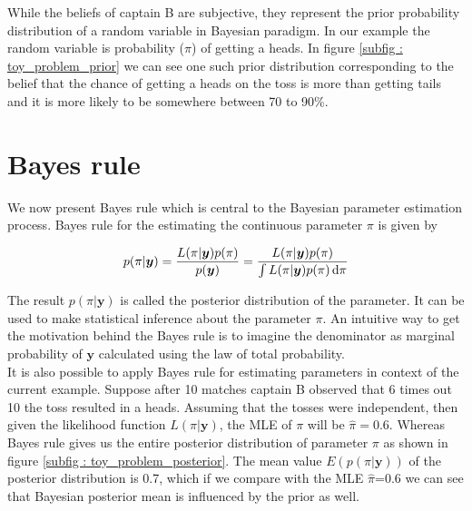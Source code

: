 While the beliefs of captain B are subjective, they represent the prior probability distribution of a random variable in Bayesian paradigm. In our example the random variable is probability ($\pi$) of getting a heads. In figure \ref{subfig : toy_problem_prior} we can see one such prior distribution corresponding to the belief that the chance of getting a heads on the toss is more than getting tails and it is more likely to be somewhere between 70 to 90\%.

\section{Bayes rule}
\label{sec : bayes_rule}
We now present Bayes rule which is central to the Bayesian parameter estimation process. Bayes rule for the estimating the continuous parameter $\pi$ is given by

\begin{equation}
\label{eq : bayes_rule}
p(\pi|\boldsymbol{y}) = \dfrac{L(\pi|\boldsymbol{y})p(\pi)}{p(\boldsymbol{y})} = \dfrac{L(\pi|\boldsymbol{y})p(\pi)}{\int L(\pi|\boldsymbol{y})p(\pi)\mathop{}\!\mathrm{d}\pi}
\end{equation}

The result $p(\pi|\boldsymbol{y})$ is called the posterior distribution of the parameter. It can be used to make statistical inference about the parameter $\pi$. An intuitive way to get the motivation behind the Bayes rule is to imagine the denominator as marginal probability of $\boldsymbol{y}$ calculated using the law of total probability.\\

It is also possible to apply Bayes rule for estimating parameters in context of the current example. Suppose after 10 matches captain B observed that 6 times out 10 the toss resulted in a heads. Assuming that the tosses were independent, then given the likelihood function $L(\pi|\boldsymbol{y})$, the MLE of $\pi$ will be $\hat{\pi} = 0.6$. Whereas Bayes rule gives us the entire posterior distribution of parameter $\pi$ as shown in figure \ref{subfig : toy_problem_posterior}. The mean value $E(p(\pi|\boldsymbol{y}))$ of the posterior distribution is 0.7, which if we compare with the MLE $\hat{\pi}$=0.6 we can see that Bayesian posterior mean is influenced by the prior as well.

